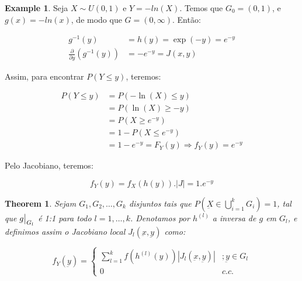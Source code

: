 \documentclass[
]{article}
\newtheorem{theorem}{Theorem}[section]
\theoremstyle{definition}
\theoremstyle{definition}
\newtheorem{example}{Example}[section]
\theoremstyle{definition}
\theoremstyle{definition}
\theoremstyle{remark}
\begin{document}
\begin{example}
Seja \(X \sim U(0,1)\) e \(Y = -ln(X)\). Temos que \(G_{0} = (0,1)\), e \(g(x) = -ln(x)\), de modo que \(G = (0, \infty)\). Então:

\begin{align*}
g^{-1}(y) &= h(y) = \exp(-y) = e^{-y} \\
\frac{\partial}{\partial y}(g^{-1}(y)) &= -e^{-y} = J(x,y)
\end{align*}

Assim, para encontrar \(P(Y \le y)\), teremos:

\begin{align*}
P(Y \le y) &= P(-\ln(X) \le y) \\
&= P(\ln(X) \ge -y) \\
&= P(X \ge e^{-y}) \\
&= 1 - P(X \le e^{-y}) \\
&= 1 - e^{-y} = F_{Y}(y) \Longrightarrow f_{Y}(y) = e^{-y}
\end{align*}

Pelo Jacobiano, teremos:

\begin{equation*}
f_{Y}(y) = f_{X}(h(y)).|J| = 1 . e^{-y}
\end{equation*}
\end{example}

\begin{theorem}
Sejam \(G_{1}, G_{2}, \ldots, G_{k}\) disjuntos tais que \(P\left(\underbar{X} \in \bigcup_{i=1}^{k}G_{i}\right) = 1\), tal que \(g\big{|}_{G_{l}}\) é 1:1 para todo \(l = 1, \ldots, k\). Denotamos por \(h^{(l)}\) a inversa de \(g\) em \(G_{l}\), e definimos assim o Jacobiano local \(J_{l}(\underbar{x},\underbar{y})\) como:

\begin{equation*}
f_{Y}(\underbar{y}) = \begin{cases}
\sum_{l=1}^{k}f\left(h^{(l)}(y)\right)|J_{l}(\underbar{x},\underbar{y})| & ;\underbar{y} \in G_{l} \\
0 & c.c.
\end{cases}
\end{equation*}
\end{theorem}
\end{document}
